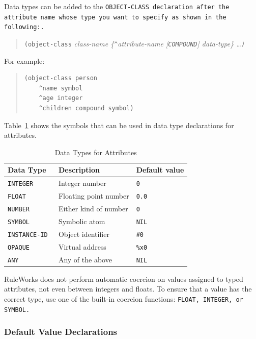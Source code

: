 Data types can be added to the \tt{OBJECT-CLASS} declaration after
the attribute name whose type you want to specify as shown in
the following:.

\begin{quote}
  \verb|(object-class| \it{class-name} \{\verb|^|\it{attribute-name}
    [\verb|COMPOUND|] \it{data-type}\} \ldots \verb|)|
\end{quote}

For example:

\begin{quote}
\begin{verbatim}
(object-class person
    ^name symbol
    ^age integer
    ^children compound symbol)
\end{verbatim}
\end{quote}

Table~\ref{t:2-2} shows the symbols that can be used in data type
declarations for attributes.

\begin{table}[h]
  \centering
  \begin{tabular}{lll}
    \toprule
    Data Type & Description & Default value \\
    \midrule
    \tt{INTEGER}     & Integer number        & \tt{0} \\
    \tt{FLOAT}       & Floating point number & \tt{0.0} \\
    \tt{NUMBER}      & Either kind of number & \tt{0} \\
    \tt{SYMBOL}      & Symbolic atom         & \tt{NIL} \\
    \tt{INSTANCE-ID} & Object identifier     & \verb|#0| \\
    \tt{OPAQUE}      & Virtual address       & \verb|%x0| \\
    \tt{ANY}         & Any of the above      & \tt{NIL} \\  
    \bottomrule
  \end{tabular}
  \caption{Data Types for Attributes}
  \label{t:2-2}
\end{table}

RuleWorks does not perform automatic coercion on values
assigned to typed attributes, not even between integers and
floats. To ensure that a value has the correct type, use one
of the built-in coercion functions: \tt{FLOAT}, \tt{INTEGER}, or
\tt{SYMBOL}.

\subsubsection{Default Value Declarations}

